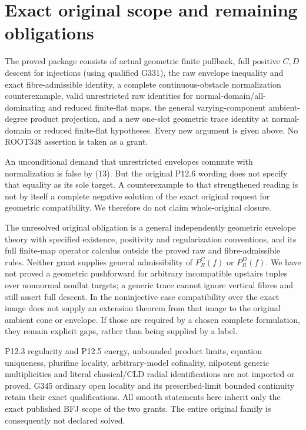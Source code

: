\documentclass[11pt]{article}
\begin{document}
\section{Exact original scope and remaining obligations}
\label{sec:scope}
The proved package consists of actual geometric finite pullback,
full positive \(C,D\) descent for injections (using qualified
G331), the raw envelope inequality and exact fibre-admissible
identity, a complete continuous-obstacle normalization
counterexample, valid unrestricted raw identities for
normal-domain/all-dominating and reduced finite-flat maps,
the general varying-component ambient-degree product
projection, and a new one-slot geometric trace identity
at normal-domain or reduced finite-flat hypotheses.
Every new argument is given above. No ROOT348 assertion
is taken as a grant.

An unconditional demand that unrestricted envelopes commute
with normalization is false by (13). But the original
P12.6 wording does not specify that equality as its sole
target. A counterexample to that strengthened reading is
not by itself a complete negative solution of the exact
original request for geometric compatibility. We therefore
do not claim whole-original closure.

The unresolved original obligation is a general independently
geometric envelope theory with specified existence, positivity
and regularization conventions, and its full finite-map
operator calculus outside the proved raw and fibre-admissible
rules. Neither grant supplies general admissibility of
\(P_R^C(f)\) or \(P_R^D(f)\). We have not proved a geometric
pushforward for arbitrary incompatible upstairs tuples over
nonnormal nonflat targets; a generic trace cannot ignore
vertical fibres and still assert full descent. In the
noninjective case compatibility over the exact image does
not supply an extension theorem from that image to the
original ambient cone or envelope. If those are required
by a chosen complete formulation, they remain explicit
gaps, rather than being supplied by a label.

P12.3 regularity and P12.5 energy, unbounded product limits,
equation uniqueness, plurifine locality, arbitrary-model
cofinality, nilpotent generic multiplicities and literal
classical/CLD radial identifications are not imported or
proved. G345 ordinary open locality and its prescribed-limit
bounded continuity retain their exact qualifications.
All smooth statements here inherit only the exact published
BFJ scope of the two grants.
The entire original family is consequently not declared solved.
\end{document}

